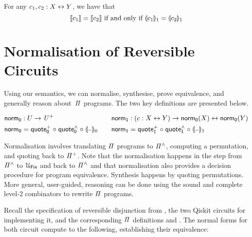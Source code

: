 \begin{theorem}
  For any $c_1, c_2 : X \mathrel{\leftrightarrow} Y$, we have that
  \[
    \llbracket c_1\rrbracket = \llbracket c_2\rrbracket \text{ if and only if } \llparenthesis c_1\rrparenthesis_{1} = \llparenthesis c_2\rrparenthesis_{1}
  \]
\end{theorem}

\section{Normalisation of Reversible Circuits}
\label{sec:applications}

Using our semantics, we can normalise, synthesise, prove equivalence, and generally reason about~$\mathit{\Pi}$ programs. The
two key definitions are presented below.

\begin{definition}
  \begin{gather*}
    \begin{aligned}
      \normt_{0} & : U \to \UPlus                                            \\
      \normt_{0} & = \quotep_{0} \comp \quoteh_{0} \comp \gdenot{\blank}_{0}
    \end{aligned}
    \qquad
    \begin{aligned}
      \normt_{1} & : (c : X \iso Y) \to \normt_{0}(X) \iso \normt_{0}(Y)     \\
      \normt_{1} & = \quotep_{1} \comp \quoteh_{1} \comp \gdenot{\blank}_{1}
    \end{aligned}
  \end{gather*}
\end{definition}

\noindent Normalisation involves translating $\mathit{\Pi}$ programs to $\mathit{{\Pi}^{\wedge}}$, computing a permutation, and quoting
back to $\mathit{{\Pi}^{+}}$. Note that the normalisation happens in the step from $\mathit{{\Pi}^{\wedge}}$ to $\UFin$ and back to
$\mathit{{\Pi}^{\wedge}}$ and that normalisation also provides a decision procedure for program equivalence. Synthesis happens by
quoting permutations. More general, user-guided, reasoning can be done using the sound and complete level-2
combinators to rewrite $\mathit{\Pi}$ programs.

Recall the specification of reversible disjunction from , the two Qiskit circuits for implementing
it, and the corresponding $\mathit{\Pi}$ definitions  and . The normal forms for both
circuit compute to the following, establishing their equivalence:

